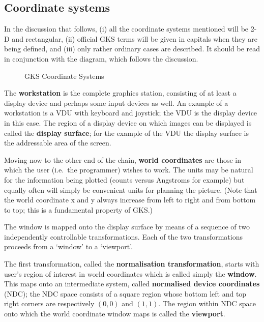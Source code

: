 \subsection* {Coordinate systems}\label{app-coordinates}

In the discussion that follows, (i) all the coordinate systems
mentioned will be 2-D and rectangular, (ii) official
GKS terms will be given in capitals when they are being
defined, and (iii) only rather ordinary cases are described.  It
should be read in conjunction with the diagram, which follows the
discussion.
                     
\begin{figure}
   \vspace{190mm}
   \caption{GKS Coordinate Systems}
\end{figure}

The {\bf workstation} is the complete
graphics station,
consisting of at least a display device and perhaps some input
devices as well.  An example of a workstation is a VDU with keyboard
and joystick;  the VDU is the display device in this case.  The
region of a display device on which images can be displayed
is called the {\bf display surface};  for
the example of the VDU the display surface is the addressable
area of the screen.

Moving now to the other end of the chain,
{\bf world coordinates} are those in which the user (i.e.\ the
programmer) wishes to work.  The units may be natural
for the information being plotted (counts versus Angstroms
for example)
but equally often will simply be convenient units
for planning the picture.  (Note that the world coordinate x and y
always increase from left to right and from bottom to top;  this is a
fundamental property of GKS.)

The window is mapped onto the display surface by means of
a sequence of two independently
controllable transformations.  Each of the
two transformations proceeds from a `window'
to a `viewport'.

The first transformation, called the
{\bf normalisation transformation}, starts with user's region
of interest in world coordinates which is called simply
the {\bf window}.  This maps onto an intermediate
system, called {\bf normalised device coordinates} (NDC);  the
NDC space consists
of a square region whose bottom left
and top right corners are respectively $(0,0)$ and $(1,1)$.  The
region within NDC space onto which the world coordinate
window maps is called the {\bf viewport}.

